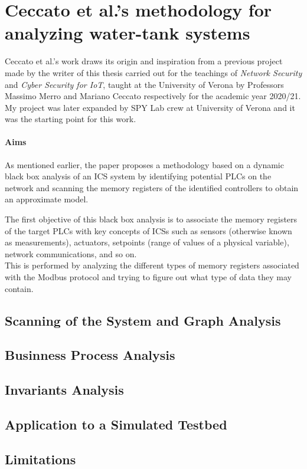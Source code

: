 \section{Ceccato et al.’s methodology for analyzing water-tank systems}
\label{sec:ceccato_metodology}
Ceccato et al.'s work draws its origin and inspiration from a previous project made by the writer of this thesis \cite{ns_proj} carried out for the teachings of \textit{Network Security} and \textit{Cyber Security for IoT}, taught at the University of Verona by Professors Massimo Merro and Mariano Ceccato respectively for the academic year 2020/21. \newline
My project was later expanded by SPY Lab crew at University of Verona and it was the starting point for this work.

\paragraph{Aims} As mentioned earlier, the paper proposes a methodology based on a dynamic black box analysis of an ICS system by identifying potential PLCs on the network and scanning the memory registers of the identified controllers to obtain an approximate model.

\bigskip
The first objective of this black box analysis is to associate the memory registers of the target PLCs with key concepts of ICSs such as sensors (otherwise known as measurements), actuators, setpoints (range of values of a physical variable), network communications, and so on.\\
This is performed by analyzing the different types of memory registers associated with the Modbus protocol and trying to figure out what type of data they may contain.

\vfill
\subsection{Scanning of the System and Graph Analysis}
\label{subsec:ceccato_graphanalysis}

\subsection{Businness Process Analysis}
\label{subsec:ceccato_businessprocess}

\subsection{Invariants Analysis}
\label{subsec:ceccato_invariants}

\subsection{Application to a Simulated Testbed}
\label{subsec:ceccato_testbed}

\subsection{Limitations}
\label{subsec:ceccato_limitations}

\nolinenumbers
\vfill